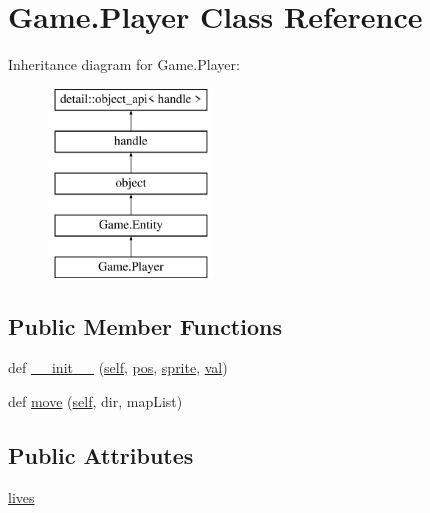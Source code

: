 \hypertarget{class_game_1_1_player}{}\section{Game.\+Player Class Reference}
\label{class_game_1_1_player}
Inheritance diagram for Game.\+Player\+:\begin{figure}[H]
\begin{center}
\leavevmode
\includegraphics[height=5.000000cm]{class_game_1_1_player}
\end{center}
\end{figure}
\subsection*{Public Member Functions}
\begin{DoxyCompactItemize}
\item 
def \mbox{\hyperlink{class_game_1_1_player_af39ee9cc682269f7f1c1494b8855a1cb}{\+\_\+\+\_\+init\+\_\+\+\_\+}} (\mbox{\hyperlink{modsupport_8h_a0180ca1808366e5da641475e8bf8cca3}{self}}, \mbox{\hyperlink{class_game_1_1_entity_a982b731c21081324b5809d7a88781b43}{pos}}, \mbox{\hyperlink{class_game_1_1_entity_ac8064353c61c836135c530e8fc77842b}{sprite}}, \mbox{\hyperlink{_s_d_l__opengl__glext_8h_a26942fd2ed566ef553eae82d2c109c8f}{val}})
\item 
def \mbox{\hyperlink{class_game_1_1_player_af495ce554741a4feb640d981aaea79b7}{move}} (\mbox{\hyperlink{modsupport_8h_a0180ca1808366e5da641475e8bf8cca3}{self}}, dir, map\+List)
\end{DoxyCompactItemize}
\subsection*{Public Attributes}
\begin{DoxyCompactItemize}
\item 
\mbox{\hyperlink{class_game_1_1_player_a09c47b9c7ba0a524773fa83e9afe747c}{lives}}
\end{DoxyCompactItemize}
